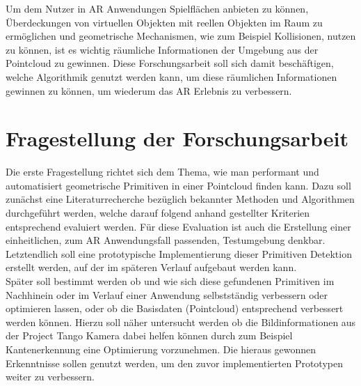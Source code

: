 Um dem Nutzer in AR Anwendungen Spielflächen anbieten zu können, Überdeckungen von virtuellen Objekten mit reellen Objekten im Raum zu ermöglichen und geometrische Mechanismen, wie zum Beispiel Kollisionen, nutzen zu können, ist es wichtig räumliche Informationen der Umgebung aus der Pointcloud zu gewinnen. Diese Forschungsarbeit soll sich damit beschäftigen, welche Algorithmik genutzt werden kann, um diese räumlichen Informationen gewinnen zu können, um wiederum das AR Erlebnis zu verbessern. 

\section{Fragestellung der Forschungsarbeit}

Die erste Fragestellung richtet sich dem Thema, wie man performant und automatisiert geometrische Primitiven in einer Pointcloud finden kann. Dazu soll zunächst eine Literaturrecherche bezüglich bekannter Methoden und Algorithmen durchgeführt werden, welche darauf folgend anhand gestellter Kriterien entsprechend evaluiert werden. Für diese Evaluation ist auch die Erstellung einer einheitlichen, zum AR Anwendungsfall passenden, Testumgebung denkbar. Letztendlich soll eine prototypische Implementierung dieser Primitiven Detektion erstellt werden, auf der im späteren Verlauf aufgebaut werden kann.\\

Später soll bestimmt werden ob und wie sich diese gefundenen Primitiven im Nachhinein oder im Verlauf einer Anwendung selbstständig verbessern oder optimieren lassen, oder ob die Basisdaten (Pointcloud) entsprechend verbessert werden können. Hierzu soll näher untersucht werden ob die Bildinformationen aus der Project Tango Kamera dabei helfen können durch zum Beispiel Kantenerkennung eine Optimierung vorzunehmen. Die hieraus gewonnen Erkenntnisse sollen genutzt werden, um den zuvor implementierten Prototypen weiter zu verbessern.